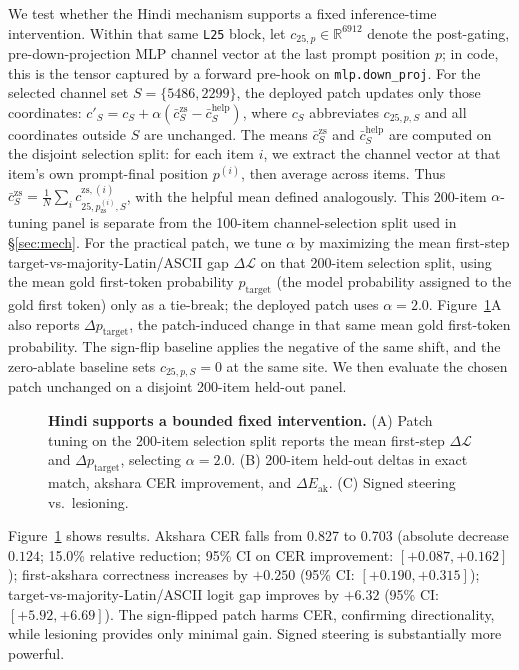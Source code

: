 \documentclass{article}
\begin{document}
We test whether the Hindi mechanism supports a fixed inference-time intervention. Within that same \texttt{L25} block, let $c_{25,p} \in \mathbb{R}^{6912}$ denote the post-gating, pre-down-projection MLP channel vector at the last prompt position $p$; in code, this is the tensor captured by a forward pre-hook on \texttt{mlp.down\_proj}. For the selected channel set $S = \{5486,2299\}$, the deployed patch updates only those coordinates: $c'_S = c_S + \alpha(\bar c^{\mathrm{zs}}_S - \bar c^{\mathrm{help}}_S)$, where $c_S$ abbreviates $c_{25,p,S}$ and all coordinates outside $S$ are unchanged. The means $\bar c^{\mathrm{zs}}_S$ and $\bar c^{\mathrm{help}}_S$ are computed on the disjoint selection split: for each item $i$, we extract the channel vector at that item's own prompt-final position $p^{(i)}$, then average across items. Thus $\bar c^{\mathrm{zs}}_S = \frac{1}{N}\sum_i c^{\mathrm{zs},(i)}_{25,p^{(i)}_{\mathrm{zs}},S}$, with the helpful mean defined analogously. This 200-item $\alpha$-tuning panel is separate from the 100-item channel-selection split used in \S\ref{sec:mech}. For the practical patch, we tune $\alpha$ by maximizing the mean first-step target-vs-majority-Latin/ASCII gap $\Delta \mathcal{L}$ on that 200-item selection split, using the mean gold first-token probability $p_{\mathrm{target}}$ (the model probability assigned to the gold first token) only as a tie-break; the deployed patch uses $\alpha=2.0$. Figure~\ref{fig:hpatch}A also reports $\Delta p_{\mathrm{target}}$, the patch-induced change in that same mean gold first-token probability. The sign-flip baseline applies the negative of the same shift, and the zero-ablate baseline sets $c_{25,p,S}=0$ at the same site. We then evaluate the chosen patch unchanged on a disjoint 200-item held-out panel.

\begin{figure}[t]
    \centering
    \resizebox{\linewidth}{!}{}
    \caption{\textbf{Hindi supports a bounded fixed intervention.} (A) Patch tuning on the 200-item selection split reports the mean first-step $\Delta \mathcal{L}$ and $\Delta p_{\mathrm{target}}$, selecting $\alpha=2.0$. (B) 200-item held-out deltas in exact match, akshara CER improvement, and $\Delta E_{\mathrm{ak}}$. (C) Signed steering vs.\ lesioning.}
    \label{fig:hpatch}
\end{figure}

Figure~\ref{fig:hpatch} shows results. Akshara CER falls from 0.827 to 0.703 (absolute decrease $0.124$; 15.0\% relative reduction; 95\% CI on CER improvement: $[+0.087, +0.162]$); first-akshara correctness increases by $+0.250$ (95\% CI: $[+0.190, +0.315]$); target-vs-majority-Latin/ASCII logit gap improves by $+6.32$ (95\% CI: $[+5.92, +6.69]$). The sign-flipped patch harms CER, confirming directionality, while lesioning provides only minimal gain. Signed steering is substantially more powerful.
\end{document}

